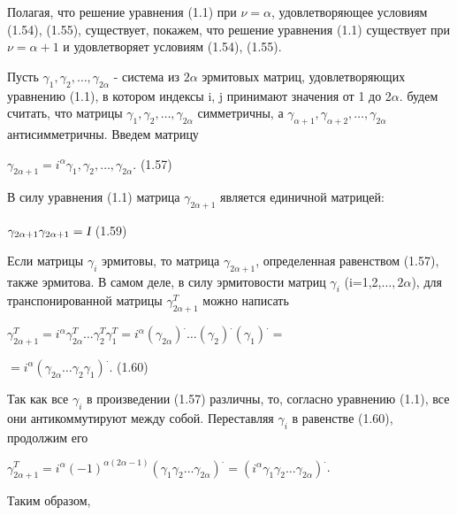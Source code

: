 \documentclass{article}
\begin{document}
{Полагая, что решение уравнения (1.1) при $\nu=\alpha$, удовлетворяющее условиям (1.54), (1.55), существует, покажем, что решение уравнения (1.1) существует при $\nu=\alpha+1$ и удовлетворяет условиям (1.54), (1.55).\par
Пусть $\gamma_1,\gamma_2,\dots,\gamma_{2\alpha}$ - система из $2\alpha$ эрмитовых матриц, удовлетворяющих уравнению (1.1), в котором индексы i, j принимают значения от 1 до 2$\alpha$. будем считать, что матрицы $\gamma_1,\gamma_2,\dots,\gamma_{2\alpha}$ симметричны, а $\gamma_{\alpha+1},\gamma_{\alpha+2},\dots,\gamma_{2\alpha}$ антисимметричны. Введем матрицу\par
\begin{center}
$\gamma_{2\alpha+1}=i^{\alpha}\gamma_1,\gamma_2,\dots,\gamma_{2\alpha}.$        (1.57)\par
\end{center}
В силу уравнения (1.1) матрица $\gamma_{2\alpha+1}$ является единичной матрицей: \par
\begin{center}
$\gamma_{2\alpha+1}\gamma_{2\alpha+1}=\textsl{I}$       (1.59)\par
\end{center}
Если матрицы $\gamma_i$ эрмитовы, то матрица $\gamma_{2\alpha+1}$, определенная равенством (1.57), также эрмитова. В самом деле, в силу эрмитовости матриц $\gamma_i$ (i=1,2,$\dots,2\alpha$), для транспонированной матрицы $\gamma^{T}_{2\alpha+1}$ можно написать \par
$\gamma^{T}_{2\alpha+1}=i^{\alpha}\gamma^{T}_{2\alpha}\dots\gamma^{T}_{2}\gamma^{T}_{1}=i^{\alpha}(\gamma_{2\alpha})^{.}\dots(\gamma_{2})^{.}(\gamma_1)^{.}=$\par
\begin{flushright}{$=i^{\alpha}(\gamma_{2\alpha}\dots\gamma_2\gamma_1)^{.}.$ (1.60)}
\end{flushright}\par
Так как все $\gamma_i$ в произведении (1.57) различны, то, согласно уравнению (1.1), все они антикоммутируют между собой. Переставляя $\gamma_i$ в равенстве (1.60), продолжим его\par
\begin{center}
$\gamma^{T}_{2\alpha+1}=i^{\alpha}(-1)^{\alpha(2\alpha-1)}(\gamma_1\gamma_2\dots\gamma_{2\alpha})^{.}=(i^{\alpha}\gamma_1\gamma_2\dots\gamma_{2\alpha})^{.}$.\par
\end{center}
Таким образом,\par
\begin{center}

\end{center}}
\end{document}

